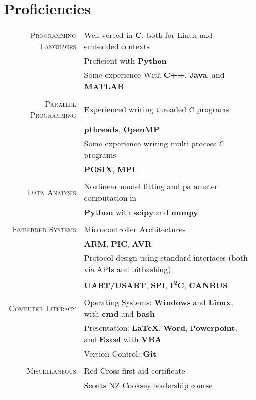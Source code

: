 \documentclass[a4paper,10pt]{article} %
\begin{document}
\section{Proficiencies}

\begin{tabular}{r|l}
	
\textsc{Programming Languages} & Well-versed in \textbf{C}, both for Linux and embedded contexts \\ 
& Proficient with \textbf{Python} \\
& Some experience With \textbf{C++}, \textbf{Java}, and \textbf{MATLAB} \\
\multicolumn{2}{c}{} \\

\textsc{Parallel Programming} & Experienced writing threaded C programs \\
& \quad \small{\textbf{pthreads}, \textbf{OpenMP}} \\
& Some experience writing multi-process C programs \\
& \quad \small{\textbf{POSIX}, \textbf{MPI}} \\
\multicolumn{2}{c}{} \\

\textsc{Data Analysis} & Nonlinear model fitting and parameter computation in \\
& \textbf{Python} with \textbf{scipy} and \textbf{numpy} \\
\multicolumn{2}{c}{} \\

\textsc{Embedded Systems} & Microcontroller Architectures \\
& \quad \small{\textbf{ARM}, \textbf{PIC}, \textbf{AVR}} \\
& Protocol design using standard interfaces (both via APIs and bitbashing)  \\
& \quad \small{\textbf{UART/USART}, \textbf{SPI}, \textbf{I\textsuperscript{2}C}, \textbf{CANBUS}} \\
\multicolumn{2}{c}{} \\

\textsc{Computer Literacy} & Operating Systems: \textbf{Windows} and \textbf{Linux}, with \textbf{cmd} and \textbf{bash} \\
& Presentation: \textbf{\LaTeX}, \textbf{Word}, \textbf{Powerpoint}, and \textbf{Excel} with \textbf{VBA} \\
& Version Control: \textbf{Git} \\
\multicolumn{2}{c}{} \\

\textsc{Miscellaneous} & Red Cross first aid certificate \\
& Scouts NZ Cooksey leadership course\\
\multicolumn{2}{c}{} \\

\end{tabular}
\end{document}
